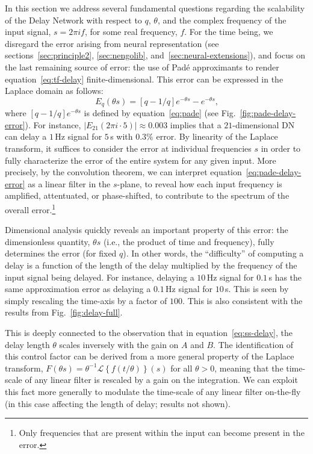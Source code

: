 In this section we address several fundamental questions regarding the scalability of the Delay Network with respect to $q$, $\theta$, and the complex frequency of the input signal, $s = 2 \pi i f$, for some real frequency, $f$.
For the time being, we disregard the error arising from neural representation (see sections~\ref{sec:principle2}, \ref{sec:nengolib}, and~\ref{sec:neural-extensions}), and focus on the last remaining source of error: the use of Pad\'e approximants to render equation~\ref{eq:tf-delay} finite-dimensional.
This error can be expressed in the Laplace domain as follows:
\begin{equation} \label{eq:pade-delay-error}
E_q(\theta s) = [q-1/q]e^{-\theta s} - e^{-\theta s} \text{,}
\end{equation}
where $[q-1/q]e^{-\theta s}$ is defined by equation~\ref{eq:pade} (see Fig.~\ref{fig:pade-delay-error}).
For instance, $|E_{21}(2 \pi i \cdot 5)| \approx 0.003$ implies that a $21$-dimensional DN can delay a $1$\,Hz signal for $5$\,s with $0.3\%$ error.
By linearity of the Laplace transform, it suffices to consider the error at individual frequencies $s$ in order to fully characterize the error of the entire system for any given input.
More precisely, by the convolution theorem, we can interpret equation~\ref{eq:pade-delay-error} as a linear filter in the $s$-plane, to reveal how each input frequency is amplified, attentuated, or phase-shifted, to contribute to the spectrum of the overall error.\footnote{
Only frequencies that are present within the input can become present in the error.}

Dimensional analysis quickly reveals an important property of this error: the dimensionless quantity, $\theta s$ (i.e., the product of time and frequency), fully determines the error (for fixed $q$).
In other words, the ``difficulty'' of computing a delay is a function of the length of the delay multiplied by the frequency of the input signal being delayed.
For instance, delaying a $10$\,Hz signal for $0.1$\,s has the same approximation error as delaying a $0.1$\,Hz signal for $10$\,s.
This is seen by simply rescaling the time-axis by a factor of $100$.
This is also consistent with the results from Fig.~\ref{fig:delay-full}.

This is deeply connected to the observation that in equation~\ref{eq:ss-delay}, the delay length $\theta$ scales inversely with the gain on $A$ and $B$.
The identification of this control factor can be derived from a more general property of the Laplace transform, $F \left( \theta s \right) = \theta^{-1} \mathcal{L} \left\{ f \left( t / \theta \right) \right\} (s)$ for all $\theta > 0$, meaning that the time-scale of any linear filter is rescaled by a gain on the integration.
We can exploit this fact more generally to modulate the time-scale of any linear filter on-the-fly (in this case affecting the length of delay; results not shown).

